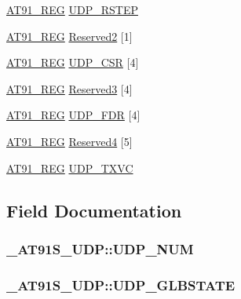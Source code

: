 \begin{CompactItemize}
\item 
\hyperlink{AT91SAM7X256_8h_712ad5a1ac1bd02f3e95a7526c283ce1}{AT91\_\-REG} \hyperlink{struct__AT91S__UDP_b171e6dc8a3bade2c3ba5359d74b7fea}{UDP\_\-RSTEP}
\item 
\hyperlink{AT91SAM7X256_8h_712ad5a1ac1bd02f3e95a7526c283ce1}{AT91\_\-REG} \hyperlink{struct__AT91S__UDP_0c441ba136413330a5de9dd5160d4d42}{Reserved2} \mbox{[}1\mbox{]}
\item 
\hyperlink{AT91SAM7X256_8h_712ad5a1ac1bd02f3e95a7526c283ce1}{AT91\_\-REG} \hyperlink{struct__AT91S__UDP_b580e8f3463413dae9a97276d2967a15}{UDP\_\-CSR} \mbox{[}4\mbox{]}
\item 
\hyperlink{AT91SAM7X256_8h_712ad5a1ac1bd02f3e95a7526c283ce1}{AT91\_\-REG} \hyperlink{struct__AT91S__UDP_5510369d42dacd07d35b4bf302e701fc}{Reserved3} \mbox{[}4\mbox{]}
\item 
\hyperlink{AT91SAM7X256_8h_712ad5a1ac1bd02f3e95a7526c283ce1}{AT91\_\-REG} \hyperlink{struct__AT91S__UDP_54d00cd461a9f587e9cb972da54e48fb}{UDP\_\-FDR} \mbox{[}4\mbox{]}
\item 
\hyperlink{AT91SAM7X256_8h_712ad5a1ac1bd02f3e95a7526c283ce1}{AT91\_\-REG} \hyperlink{struct__AT91S__UDP_daf5abeb7f583c4d7e4f9765ed8af068}{Reserved4} \mbox{[}5\mbox{]}
\item 
\hyperlink{AT91SAM7X256_8h_712ad5a1ac1bd02f3e95a7526c283ce1}{AT91\_\-REG} \hyperlink{struct__AT91S__UDP_f4a766ffccdbe79e17f95783df644e03}{UDP\_\-TXVC}
\end{CompactItemize}


\subsection{Field Documentation}
\hypertarget{struct__AT91S__UDP_dc10dbeb36dd030a78d80a0f2f4e1f5c}{
\subsubsection{ {\bf \_\-AT91S\_\-UDP::UDP\_\-NUM}}}
\label{struct__AT91S__UDP_dc10dbeb36dd030a78d80a0f2f4e1f5c}


\hypertarget{struct__AT91S__UDP_56f35ef281d58bbdde56a5a38750fc2e}{
\subsubsection{ {\bf \_\-AT91S\_\-UDP::UDP\_\-GLBSTATE}}}
\label{struct__AT91S__UDP_56f35ef281d58bbdde56a5a38750fc2e}




